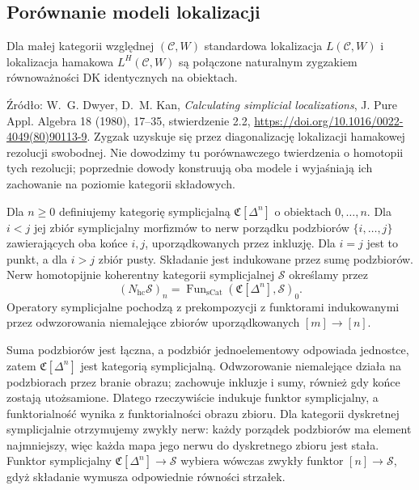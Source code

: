 \subsection{Porównanie modeli lokalizacji}

\begin{twierdzenie}\label{cat:thm:dk-comparison}
Dla małej kategorii względnej $(\mathcal C,W)$ standardowa lokalizacja $L(\mathcal C,W)$ i lokalizacja hamakowa $L^H(\mathcal C,W)$ są połączone naturalnym zygzakiem równoważności DK identycznych na obiektach.
\end{twierdzenie}

Źródło: W.~G. Dwyer, D.~M. Kan, \emph{Calculating simplicial localizations}, J. Pure Appl. Algebra 18 (1980), 17--35, stwierdzenie 2.2, \url{https://doi.org/10.1016/0022-4049(80)90113-9}. Zygzak uzyskuje się przez diagonalizację lokalizacji hamakowej rezolucji swobodnej. Nie dowodzimy tu porównawczego twierdzenia o homotopii tych rezolucji; poprzednie dowody konstruują oba modele i wyjaśniają ich zachowanie na poziomie kategorii składowych.

\begin{definicja}\label{cat:def:dk-coherent-nerve}
Dla $n\geq0$ definiujemy kategorię symplicjalną $\mathfrak C[\Delta^n]$ o obiektach $0,\ldots,n$. Dla $i<j$ jej zbiór symplicjalny morfizmów to nerw porządku podzbiorów $\{i,\ldots,j\}$ zawierających oba końce $i,j$, uporządkowanych przez inkluzję. Dla $i=j$ jest to punkt, a dla $i>j$ zbiór pusty. Składanie jest indukowane przez sumę podzbiorów. Nerw homotopijnie koherentny kategorii symplicjalnej $\mathcal S$ określamy przez
\[
 (N_{\mathrm{hc}}\mathcal S)_n=
 \operatorname{Fun}_{\mathrm{sCat}}(\mathfrak C[\Delta^n],\mathcal S)_0.
\]
Operatory symplicjalne pochodzą z prekompozycji z funktorami indukowanymi przez odwzorowania niemalejące zbiorów uporządkowanych $[m]\to[n]$.
\end{definicja}

Suma podzbiorów jest łączna, a podzbiór jednoelementowy odpowiada jednostce, zatem $\mathfrak C[\Delta^n]$ jest kategorią symplicjalną. Odwzorowanie niemalejące działa na podzbiorach przez branie obrazu; zachowuje inkluzje i sumy, również gdy końce zostają utożsamione. Dlatego rzeczywiście indukuje funktor symplicjalny, a funktorialność wynika z funktorialności obrazu zbioru. Dla kategorii dyskretnej symplicjalnie otrzymujemy zwykły nerw: każdy porządek podzbiorów ma element najmniejszy, więc każda mapa jego nerwu do dyskretnego zbioru jest stała. Funktor symplicjalny $\mathfrak C[\Delta^n]\to\mathcal S$ wybiera wówczas zwykły funktor $[n]\to\mathcal S$, gdyż składanie wymusza odpowiednie równości strzałek.

